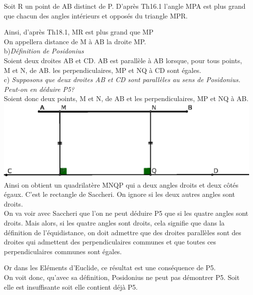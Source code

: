 \documentclass[a4paper, 12pt, twoside]{book}
\begin{document}
Soit R un point de AB distinct de P. D'après Th16.1 l'angle MPA est plus grand que chacun des angles intérieurs et opposés du triangle MPR.\

Ainsi, d'après Th18.1, MR est plus grand que MP\\

On appellera distance de M à AB la droite MP.\\

  b)\textit{Définition de Posidonius}\\
 
 
 
 Soient deux droites AB et CD. AB est parallèle à AB lorsque, pour tous points, M et N, de AB.  les perpendiculaires, MP et NQ à CD sont égales. \\
 
 c) \textit{Supposons que deux droites AB et CD sont parallèles au sens de Posidonius. Peut-on en déduire P5?}\\
 
 Soient donc deux  points, M et N, de AB et  les perpendiculaires, MP et NQ à AB.\\
 
   \includegraphics[scale=0.6]{figures/posi1.eps} \\
 
 Ainsi on obtient un quadrilatère MNQP qui a deux angles droits et deux côtés égaux. C'est le rectangle de Saccheri. On ignore si les deux autres angles sont droits.\\
On va voir avec Saccheri que l'on ne peut déduire P5 que si les quatre angles sont droits. Mais alors, si les quatre angles sont droits, cela signifie que dans la définition de l'équidistance, on doit admettre que des droites parallèles sont des droites qui admettent des perpendiculaires communes et que toutes ces perpendiculaires communes sont égales.\

Or dans les Eléments d'Euclide, ce résultat est une conséquence de P5. \\

On voit donc, qu'avec sa définition, Posidonius ne peut pas démontrer P5. Soit elle est insuffisante soit elle contient déjà P5. \\
\end{document}

